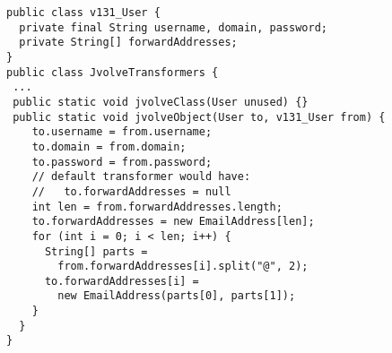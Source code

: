 \begin{figure}[t]
\centering
\begin{minipage}{0.9\textwidth}
\begin{lstlisting}[frame=single]
public class v131_User {
  private final String username, domain, password;
  private String[] forwardAddresses;
}
public class JvolveTransformers {
 ...
 public static void jvolveClass(User unused) {}
 public static void jvolveObject(User to, v131_User from) {
    to.username = from.username;
    to.domain = from.domain;
    to.password = from.password;
    // default transformer would have:
    //   to.forwardAddresses = null
    int len = from.forwardAddresses.length;
    to.forwardAddresses = new EmailAddress[len];
    for (int i = 0; i < len; i++) {
      String[] parts =
        from.forwardAddresses[i].split("@", 2);
      to.forwardAddresses[i] =
        new EmailAddress(parts[0], parts[1]);
    }
  }
}
\end{lstlisting}
\end{minipage}
\label{fig:jes-transformer-code}
\VspaceFixForHangcaption
\end{figure}
